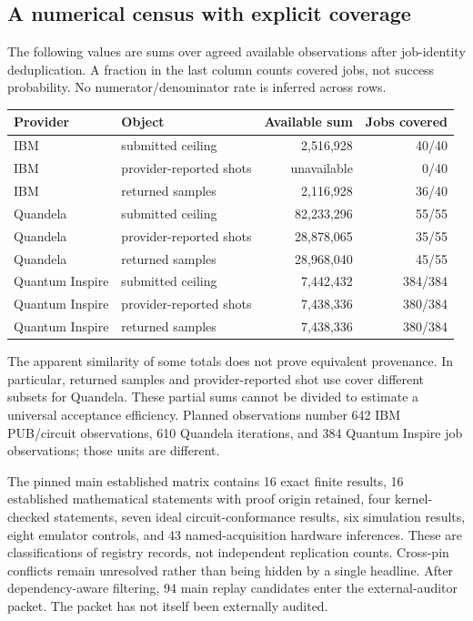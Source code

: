 \documentclass[11pt,a4paper]{article}
\begin{document}
\subsection{A numerical census with explicit coverage}
The following values are sums over agreed available observations after job-identity deduplication. A fraction in the last column counts covered jobs, not success probability. No numerator/denominator rate is inferred across rows.
\begin{center}\small
\begin{tabular}{llrr}\toprule
Provider & Object & Available sum & Jobs covered\\\midrule
IBM & submitted ceiling & 2,516,928 & 40/40\\
IBM & provider-reported shots & unavailable & 0/40\\
IBM & returned samples & 2,116,928 & 36/40\\
Quandela & submitted ceiling & 82,233,296 & 55/55\\
Quandela & provider-reported shots & 28,878,065 & 35/55\\
Quandela & returned samples & 28,968,040 & 45/55\\
Quantum Inspire & submitted ceiling & 7,442,432 & 384/384\\
Quantum Inspire & provider-reported shots & 7,438,336 & 380/384\\
Quantum Inspire & returned samples & 7,438,336 & 380/384\\\bottomrule
\end{tabular}
\end{center}
The apparent similarity of some totals does not prove equivalent provenance. In particular, returned samples and provider-reported shot use cover different subsets for Quandela. These partial sums cannot be divided to estimate a universal acceptance efficiency. Planned observations number 642 IBM PUB/circuit observations, 610 Quandela iterations, and 384 Quantum Inspire job observations; those units are different.

The pinned main established matrix contains 16 exact finite results, 16 established mathematical statements with proof origin retained, four kernel-checked statements, seven ideal circuit-conformance results, six simulation results, eight emulator controls, and 43 named-acquisition hardware inferences. These are classifications of registry records, not independent replication counts. Cross-pin conflicts remain unresolved rather than being hidden by a single headline. After dependency-aware filtering, 94 main replay candidates enter the external-auditor packet. The packet has not itself been externally audited.
\end{document}

